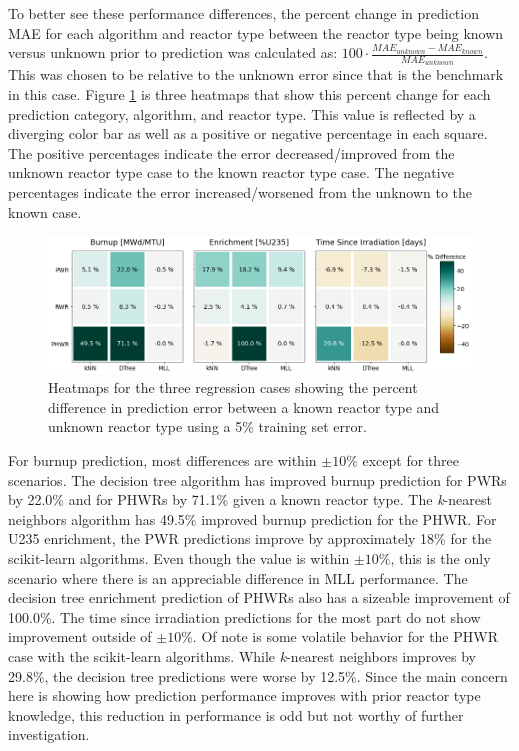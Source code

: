 To better see these performance differences, the percent change in prediction
\gls{MAE} for each algorithm and reactor type between the reactor type being
known versus unknown prior to prediction was calculated as: $100 \cdot
\frac{MAE_{unknown} - MAE_{known}}{MAE_{unknown}}$.  This was chosen to be
relative to the unknown error since that is the benchmark in this case.  Figure
\ref{fig:knownrxtr} is three heatmaps that show this percent change for each
prediction category, algorithm, and reactor type.  This value is reflected by a
diverging color bar as well as a positive or negative percentage in each
square.  The positive percentages indicate the error decreased/improved from
the unknown reactor type case to the known reactor type case.  The negative
percentages indicate the error increased/worsened from the unknown to the known
case. 

\begin{figure}[!htb]
  \centering
  \includegraphics[width=\textwidth]{./chapters/exp1/rxtr-type_known-unknown_diff_err05.png}
  \caption{Heatmaps for the three regression cases showing the percent 
           difference in prediction error between a known reactor type 
           and unknown reactor type using a 5\% training set error.}
  \label{fig:knownrxtr}
\end{figure}

For burnup prediction, most differences are within $\pm10\%$ except for three
scenarios.  The decision tree algorithm has improved burnup prediction for
\gls{PWR}s by 22.0\% and for \gls{PHWR}s by 71.1\% given a known reactor type.
The \textit{k}-nearest neighbors algorithm has 49.5\% improved burnup
prediction for the \gls{PHWR}. For \gls{U235} enrichment, the \gls{PWR}
predictions improve by approximately 18\% for the scikit-learn algorithms.
Even though the value is within $\pm10\%$, this is the only scenario where
there is an appreciable difference in \gls{MLL} performance. The decision tree
enrichment prediction of \gls{PHWR}s also has a sizeable improvement of
100.0\%.  The time since irradiation predictions for the most part do not show
improvement outside of $\pm10\%$. Of note is some volatile behavior for the
\gls{PHWR} case with the scikit-learn algorithms.  While \textit{k}-nearest
neighbors improves by 29.8\%, the decision tree predictions were worse by
12.5\%.  Since the main concern here is showing how prediction performance
improves with prior reactor type knowledge, this reduction in performance is
odd but not worthy of further investigation.


